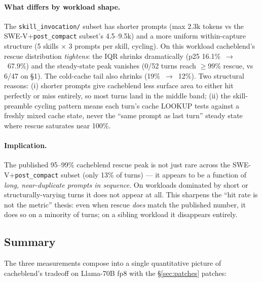 \paragraph{What differs by workload shape.} The \texttt{skill\_invocation/}
subset has shorter prompts (max 2.3k tokens vs the SWE-V+\texttt{post\_compact} subset's
4.5--9.5k) and a more uniform within-capture structure (5 skills
$\times$ 3 prompts per skill, cycling). On this workload cacheblend's
rescue distribution \emph{tightens}: the IQR shrinks dramatically
(p25 16.1\%~$\to$~67.9\%) and the steady-state peak vanishes (0/52
turns reach $\geq$99\% rescue, vs 6/47 on §1). The cold-cache tail
also shrinks (19\%~$\to$~12\%). Two structural reasons: (i) shorter
prompts give cacheblend less surface area to either hit perfectly or
miss entirely, so most turns land in the middle band; (ii) the
skill-preamble cycling pattern means each turn's cache LOOKUP tests
against a freshly mixed cache state, never the ``same prompt as
last turn'' steady state where rescue saturates near 100\%.

\paragraph{Implication.} The published 95--99\% cacheblend rescue
peak is not just rare across the SWE-V+\texttt{post\_compact} subset (only 13\% of turns) --- it
appears to be a function of \emph{long, near-duplicate prompts in
sequence}. On workloads dominated by short or structurally-varying
turns it does not appear at all. This sharpens the
``hit rate is not the metric'' thesis: even when rescue \emph{does}
match the published number, it does so on a minority of turns; on
a sibling workload it disappears entirely.

\subsection{Summary}
\label{sec:eval-summary}

The three measurements compose into a single quantitative picture of
cacheblend's tradeoff on Llama-70B fp8 with the \S\ref{sec:patches}
patches:


